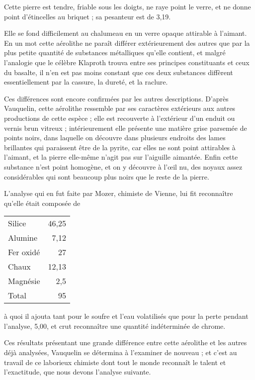 \documentclass[a4paper, 12pt, oneside, french]{article}
\begin{document}
Cette pierre est tendre, friable sous les doigts, ne raye point le verre, et ne donne point d'étincelles au briquet ; sa pesanteur est de 3,19.

Elle se fond difficilement au chalumeau en un verre opaque attirable à l'aimant. En un mot cette aérolithe ne paraît différer extérieurement des autres que par la plus petite quantité de substances métalliques qu'elle contient, et malgré l'analogie que le célèbre Klaproth trouva entre ses principes constituants et ceux du basalte, il n'en est pas moins constant que ces deux substances diffèrent essentiellement par la cassure, la dureté, et la raclure.

Ces différences sont encore confirmées par les autres descriptions. D'après Vauquelin, cette aérolithe ressemble par ses caractères extérieurs aux autres productions de cette espèce ; elle est recouverte à l'extérieur d'un enduit ou vernis brun vitreux ; intérieurement elle présente une matière grise parsemée de points noirs, dans laquelle on découvre dans plusieurs endroits des lames brillantes qui paraissent être de la pyrite, car elles ne sont point attirables à l'aimant, et la pierre elle-même n'agit pas sur l'aiguille aimantée. Enfin cette substance n'est point homogène, et on y découvre à l'œil nu, des noyaux assez considérables qui sont beaucoup plus noirs que le reste de la pierre.

L'analyse qui en fut faite par Mozer, chimiste de Vienne, lui fit reconnaître qu'elle était composée de
\begin{table}[H]
    \centering
    \begin{tabular}{l r}
        Silice & 46,25 \\
        Alumine & 7,12 \\
        Fer oxidé & 27 \\
        Chaux & 12,13 \\
        Magnésie & 2,5 \\ \hline
        Total & 95 \\
    \end{tabular}
\end{table}
à quoi il ajouta tant pour le soufre et l'eau volatilisés que pour la perte pendant l'analyse, 5,00, et crut reconnaître une quantité indéterminée de chrome.

Ces résultats présentant une grande différence entre cette aérolithe et les autres déjà analysées, Vauquelin se détermina à l'examiner de nouveau ; et c'est au travail de ce laborieux chimiste dont tout le monde reconnaît le talent et l'exactitude, que nous devons l'analyse suivante.
\end{document}
